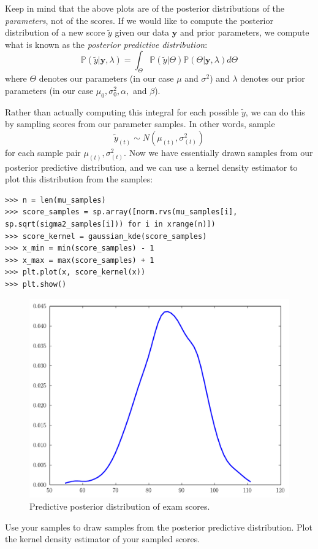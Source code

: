 Keep in mind that the above plots are of the posterior distributions of the \emph{parameters}, not of the scores. If we would like to compute the posterior distribution of a new score $\tilde{y}$ given our data $\mathbf{y}$ and prior parameters, we compute what is known as the \emph{posterior predictive distribution}: 
\begin{equation*}
\mathbb{P}(\tilde{y} | \mathbf{y}, \lambda) = \int_{\Theta} \mathbb{P}(\tilde{y} | \Theta)\mathbb{P}(\Theta | \mathbf{y}, \lambda) d\Theta
\end{equation*}
where $\Theta$ denotes our parameters (in our case $\mu$ and $\sigma^{2}$) and $\lambda$ denotes our prior parameters (in our case $\mu_{0}, \sigma_{0}^{2}, \alpha,$ and $\beta$).

Rather than actually computing this integral for each possible $\tilde{y}$, we can do this by sampling scores from our parameter samples. In other words, sample 
\begin{equation*}
\tilde{y}_{(t)} \sim N(\mu_{(t)}, \sigma_{(t)}^{2})
\end{equation*}
for each sample pair $\mu_{(t)}, \sigma_{(t)}^{2}$. Now we have essentially drawn samples from our posterior predictive distribution, and we can use a kernel density estimator to plot this distribution from the samples:
\begin{lstlisting}
>>> n = len(mu_samples)
>>> score_samples = sp.array([norm.rvs(mu_samples[i], sp.sqrt(sigma2_samples[i])) for i in xrange(n)])
>>> score_kernel = gaussian_kde(score_samples)
>>> x_min = min(score_samples) - 1
>>> x_max = max(score_samples) + 1
>>> plt.plot(x, score_kernel(x))
>>> plt.show()
\end{lstlisting}

\begin{figure}
\includegraphics[width=\textwidth]{predictiveposterior.pdf}
\caption{Predictive posterior distribution of exam scores.}
\end{figure}

\begin{problem}
Use your samples to draw samples from the posterior predictive distribution. Plot the kernel density estimator of your sampled scores.
\end{problem}